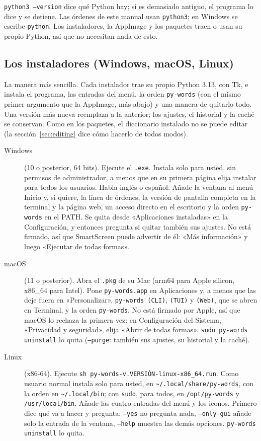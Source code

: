 \documentclass[12pt,
              article,
              oneside
              ]{memoir}
\begin{document}
\noindent
\texttt{python3 --version} dice qué Python hay; si es demasiado antiguo,
el programa lo dice y se detiene. Las órdenes de este manual usan
\texttt{python3}; en Windows se escribe \texttt{python}. Los
instaladores, la AppImage y los paquetes traen o usan su propio Python,
así que no necesitan nada de esto.

\subsection{Los instaladores (Windows, macOS, Linux)}
\label{sec:installers}

%
La manera más sencilla. Cada instalador trae su propio Python 3.13, con
Tk, e instala el programa, las entradas del menú, la orden
\texttt{py-words} (con el mismo primer argumento que la AppImage, más
abajo) y una manera de quitarlo todo. Una versión más nueva reemplaza a
la anterior; los ajustes, el historial y la caché se conservan. Como en
los paquetes, el diccionario instalado no se puede editar (la
sección~\ref{sec:editing} dice cómo hacerlo de todos modos).

\begin{description}
\item[Windows] (10 o posterior, 64 bits). Ejecute el \texttt{.exe}.
  Instala solo para usted, sin permisos de administrador, a menos que en
  su primera página elija instalar para todos los usuarios. Habla inglés
  o español. Añade la ventana al menú Inicio y, si quiere, la línea de
  órdenes, la versión de pantalla completa en la terminal y la página
  web, un acceso directo en el escritorio y la orden \texttt{py-words} en
  el PATH. Se quita desde «Aplicaciones instaladas» en la Configuración,
  y entonces pregunta si quitar también sus ajustes. No está firmado, así
  que SmartScreen puede advertir de él: «Más información» y luego
  «Ejecutar de todas formas».
\item[macOS] (11 o posterior). Abra el \texttt{.pkg} de su Mac (arm64
  para Apple silicon, x86\_64 para Intel). Pone \texttt{py-words.app} en
  Aplicaciones y, a menos que las deje fuera en «Personalizar»,
  \texttt{py-words (CLI)}, \texttt{(TUI)} y \texttt{(Web)}, que se abren
  en Terminal, y la orden \texttt{py-words}. No está firmado por Apple,
  así que macOS lo rechaza la primera vez: en Configuración del Sistema,
  «Privacidad y seguridad», elija «Abrir de todas formas».
  \texttt{sudo py-words uninstall} lo quita (\texttt{--purge}: también
  sus ajustes, su historial y la caché).
\item[Linux] (x86-64). Ejecute \texttt{sh py-words-v.VERSIÓN-linux-x86\_64.run}.
  Como usuario normal instala solo para usted, en
  \texttt{\textasciitilde/.local/share/py-words}, con la orden en
  \texttt{\textasciitilde/.local/bin}; con \texttt{sudo}, para todos, en
  \texttt{/opt/py-words} y \texttt{/usr/local/bin}. Añade las cuatro
  entradas del menú y los iconos. Primero dice qué va a hacer y
  pregunta: \texttt{--yes} no pregunta nada, \texttt{--only-gui} añade
  solo la entrada de la ventana, \texttt{--help} muestra las demás
  opciones. \texttt{py-words uninstall} lo quita.
\end{description}
\end{document}
